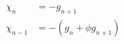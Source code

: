 \begin{equation}
 \begin{split} 
  \chi_{n} &= -g_{n+1} \\
  \chi_{n-1} &= -(g_{n} + \phi g_{n+1})
 \end{split}
\end{equation}

